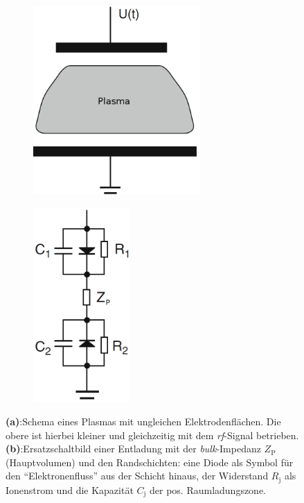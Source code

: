 \documentclass[numbers=noenddot,a4paper]{scrartcl}
\newcommand{\ix}[1]{_\text{#1}}
\newcommand{\tilt}[1]{\textit{#1}}
\newcommand{\fett}[1]{\textbf{#1}}
\begin{document}
				\begin{figure}
					\centering
					\begin{subfigure}[b]{0.48\textwidth}
						\centering
						\includegraphics[width=0.7\textwidth,height=0.8\textwidth]{figs/schaltbildselfbiaspiel1.png}
						\caption{}
						\label{img:ungleichesplasma}
					\end{subfigure}
					\begin{subfigure}[b]{0.48\textwidth}
						\centering
						\includegraphics[width=0.4\textwidth,height=0.8\textwidth]{figs/schaltbildselfbiaspiel2.png}
						\caption{}
						\label{img:ersatzschaltbild}
					\end{subfigure}
					\caption{\fett{(a)}:Schema eines Plasmas mit ungleichen Elektrodenflächen. Die obere ist hierbei kleiner und gleichzeitig mit dem \tilt{rf}-Signal betrieben. \fett{(b)}:Ersatzschaltbild einer Entladung mit der \tilt{bulk}-Impedanz $Z\ix{P}$ (Hauptvolumen) und den Randschichten: eine Diode als Symbol für den "`Elektronenfluss"' aus der Schicht hinaus, der Widerstand $R\ix{j}$ als Ionenstrom und die Kapazität $C\ix{j}$ der pos. Raumladungszone.}
				\end{figure}
		
\end{document}
